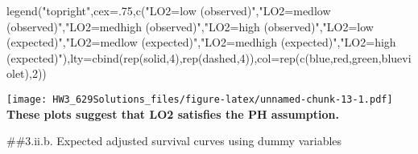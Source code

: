 \documentclass[
]{article}
\newenvironment{Shaded}{\begin{snugshade}}{\end{snugshade}}
\newcommand{\AttributeTok}[1]{\textcolor[rgb]{0.77,0.63,0.00}{#1}}
\newcommand{\DecValTok}[1]{\textcolor[rgb]{0.00,0.00,0.81}{#1}}
\newcommand{\FunctionTok}[1]{\textcolor[rgb]{0.00,0.00,0.00}{#1}}
\newcommand{\NormalTok}[1]{#1}
\newcommand{\StringTok}[1]{\textcolor[rgb]{0.31,0.60,0.02}{#1}}
\begin{document}
\begin{Shaded}
\begin{Highlighting}[]
\FunctionTok{legend}\NormalTok{(}\StringTok{"topright"}\NormalTok{,}\AttributeTok{cex=}\NormalTok{.}\DecValTok{75}\NormalTok{,}\FunctionTok{c}\NormalTok{(}\StringTok{"LO2=low (observed)"}\NormalTok{,}\StringTok{"LO2=medlow (observed)"}\NormalTok{,}\StringTok{"LO2=medhigh (observed)"}\NormalTok{,}\StringTok{"LO2=high (observed)"}\NormalTok{,}\StringTok{"LO2=low (expected)"}\NormalTok{,}\StringTok{"LO2=medlow (expected)"}\NormalTok{,}\StringTok{"LO2=medhigh (expected)"}\NormalTok{,}\StringTok{"LO2=high (expected)"}\NormalTok{),}\AttributeTok{lty=}\FunctionTok{cbind}\NormalTok{(}\FunctionTok{rep}\NormalTok{(}\StringTok{\textquotesingle{}solid\textquotesingle{}}\NormalTok{,}\DecValTok{4}\NormalTok{),}\FunctionTok{rep}\NormalTok{(}\StringTok{\textquotesingle{}dashed\textquotesingle{}}\NormalTok{,}\DecValTok{4}\NormalTok{)),}\AttributeTok{col=}\FunctionTok{rep}\NormalTok{(}\FunctionTok{c}\NormalTok{(}\StringTok{\textquotesingle{}blue\textquotesingle{}}\NormalTok{,}\StringTok{\textquotesingle{}red\textquotesingle{}}\NormalTok{,}\StringTok{\textquotesingle{}green\textquotesingle{}}\NormalTok{,}\StringTok{\textquotesingle{}blueviolet\textquotesingle{}}\NormalTok{),}\DecValTok{2}\NormalTok{)) }
\end{Highlighting}
\end{Shaded}

\texttt{[image: HW3\_629Solutions\_files/figure-latex/unnamed-chunk-13-1.pdf]}
\textbf{These plots suggest that LO2 satisfies the PH assumption.}

\#\#3.ii.b. Expected adjusted survival curves using dummy variables
\end{document}
